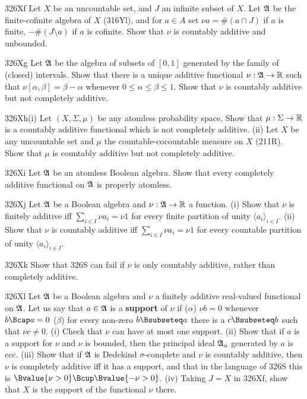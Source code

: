 {\spheader 326Xf Let $X$ be an uncountable set, and $J$ an
infinite subset of $X$.   Let $\frak A$ be the
finite-cofinite algebra of $X$ (316Yl), and for $a\in A$ set
$\nu a=\#(a\cap J)$ if $a$ is finite,
$-\#(J\setminus a)$ if $a$ is cofinite.
Show that $\nu$ is countably additive and unbounded.

\sqheader 326Xg Let $\frak A$ be the algebra of subsets of $[0,1]$
generated by the family of (closed) intervals.   Show that there is a
unique additive functional $\nu:\frak A\to\Bbb R$ such that
$\nu[\alpha,\beta]=\beta-\alpha$ whenever $0\le \alpha\le\beta\le 1$.
Show that $\nu$ is  countably additive but not completely additive.

\spheader 326Xh(i) Let $(X,\Sigma,\mu)$ be any atomless probability
space.   Show that $\mu:\Sigma\to\Bbb R$ is a countably additive
functional which is not completely additive.   (ii) Let $X$ be any
uncountable set and $\mu$ the countable-cocountable measure on $X$
(211R).   Show that $\mu$ is countably additive but not completely
additive.

\spheader 326Xi
Let $\frak A$ be an atomless Boolean algebra.   Show that
every completely additive functional on $\frak A$ is properly atomless.

\spheader 326Xj Let $\frak A$ be a Boolean algebra and
$\nu:\frak A\to\Bbb R$ a function.   (i) Show that $\nu$ is finitely
additive iff $\sum_{i\in I}\nu a_i=\nu 1$ for every finite partition of
unity $\langle a_i\rangle_{i\in I}$.   (ii) Show that $\nu$ is countably
additive iff $\sum_{i\in I}\nu a_i=\nu 1$ for every countable partition
of unity $\langle a_i\rangle_{i\in I}$.

\spheader 326Xk Show that 326S can fail if $\nu$ is only countably
additive, rather than completely additive.   

\spheader 326Xl Let $\frak A$ be a Boolean algebra and $\nu$ a finitely
additive real-valued functional on $\frak A$.   Let us say that
$a\in\frak A$ is
a {\bf support} of $\nu$ if ($\alpha$) $\nu b=0$ whenever $b\Bcap a=0$
($\beta$) for every non-zero $b\Bsubseteq a$ there is a $c\Bsubseteq b$
such that $\nu c\ne 0$.   (i) Check that $\nu$ can have at most one
support.   (ii) Show that if $a$ is a support for $\nu$ and $\nu$ is
bounded, then the principal ideal $\frak A_a$ generated by $a$ is ccc.
(iii) Show that if $\frak A$ is Dedekind $\sigma$-complete and $\nu$ is
countably additive, then $\nu$ is completely additive iff it has a
support, and that in the language of 326S this is
$\Bvalue{\nu>0}\Bcup\Bvalue{-\nu>0}$.   (iv) Taking $J=X$ in 326Xf, show
that $X$ is the support of the functional $\nu$ there.
}

